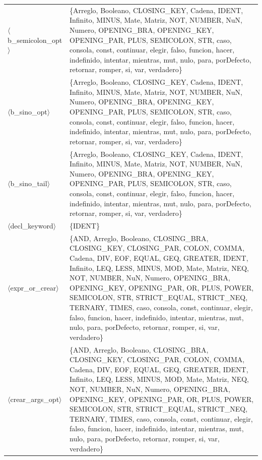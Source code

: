 \documentclass[10pt]{article}
\begin{document}
{\begin{longtable}{@{} p{3.5cm} p{13cm} @{}}
  \parbox[t]{3.3cm}{\raggedright$\langle$b\_\allowbreak{}semicolon\_\allowbreak{}opt$\rangle$} & \{Arreglo, Booleano, CLOSING\_KEY, Cadena, IDENT, Infinito, MINUS, Mate, Matriz, NOT, NUMBER, NuN, Numero, OPENING\_BRA, OPENING\_KEY, OPENING\_PAR, PLUS, SEMICOLON, STR, caso, consola, const, continuar, elegir, falso, funcion, hacer, indefinido, intentar, mientras, mut, nulo, para, porDefecto, retornar, romper, si, var, verdadero\} \\
  \parbox[t]{3.3cm}{\raggedright$\langle$b\_\allowbreak{}sino\_\allowbreak{}opt$\rangle$} & \{Arreglo, Booleano, CLOSING\_KEY, Cadena, IDENT, Infinito, MINUS, Mate, Matriz, NOT, NUMBER, NuN, Numero, OPENING\_BRA, OPENING\_KEY, OPENING\_PAR, PLUS, SEMICOLON, STR, caso, consola, const, continuar, elegir, falso, funcion, hacer, indefinido, intentar, mientras, mut, nulo, para, porDefecto, retornar, romper, si, var, verdadero\} \\
  \parbox[t]{3.3cm}{\raggedright$\langle$b\_\allowbreak{}sino\_\allowbreak{}tail$\rangle$} & \{Arreglo, Booleano, CLOSING\_KEY, Cadena, IDENT, Infinito, MINUS, Mate, Matriz, NOT, NUMBER, NuN, Numero, OPENING\_BRA, OPENING\_KEY, OPENING\_PAR, PLUS, SEMICOLON, STR, caso, consola, const, continuar, elegir, falso, funcion, hacer, indefinido, intentar, mientras, mut, nulo, para, porDefecto, retornar, romper, si, var, verdadero\} \\
  \parbox[t]{3.3cm}{\raggedright$\langle$decl\_\allowbreak{}keyword$\rangle$} & \{IDENT\} \\
  \parbox[t]{3.3cm}{\raggedright$\langle$expr\_\allowbreak{}or\_\allowbreak{}crear$\rangle$} & \{AND, Arreglo, Booleano, CLOSING\_BRA, CLOSING\_KEY, CLOSING\_PAR, COLON, COMMA, Cadena, DIV, EOF, EQUAL, GEQ, GREATER, IDENT, Infinito, LEQ, LESS, MINUS, MOD, Mate, Matriz, NEQ, NOT, NUMBER, NuN, Numero, OPENING\_BRA, OPENING\_KEY, OPENING\_PAR, OR, PLUS, POWER, SEMICOLON, STR, STRICT\_EQUAL, STRICT\_NEQ, TERNARY, TIMES, caso, consola, const, continuar, elegir, falso, funcion, hacer, indefinido, intentar, mientras, mut, nulo, para, porDefecto, retornar, romper, si, var, verdadero\} \\
  \parbox[t]{3.3cm}{\raggedright$\langle$crear\_\allowbreak{}args\_\allowbreak{}opt$\rangle$} & \{AND, Arreglo, Booleano, CLOSING\_BRA, CLOSING\_KEY, CLOSING\_PAR, COLON, COMMA, Cadena, DIV, EOF, EQUAL, GEQ, GREATER, IDENT, Infinito, LEQ, LESS, MINUS, MOD, Mate, Matriz, NEQ, NOT, NUMBER, NuN, Numero, OPENING\_BRA, OPENING\_KEY, OPENING\_PAR, OR, PLUS, POWER, SEMICOLON, STR, STRICT\_EQUAL, STRICT\_NEQ, TERNARY, TIMES, caso, consola, const, continuar, elegir, falso, funcion, hacer, indefinido, intentar, mientras, mut, nulo, para, porDefecto, retornar, romper, si, var, verdadero\} \\

\end{longtable}}
\end{document}
